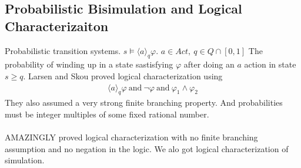 \documentclass[../598comp.tex]{subfiles}
\begin{document}
\subsection{Probabilistic Bisimulation and Logical Characterizaiton}

Probabilistic transition systems. $s \models \langle a \rangle_q \varphi$. $a
\in Act, \ q \in Q \cap [0, 1]$
The probability of winding up in a state sastisfying $\varphi$ after doing an
$a$ action in state $s \geq q$. Larsen and Skou proved logical characterization
using
\begin{gather*}
  \langle a \rangle_q \varphi \ \text{and} \ \neg \varphi \ \text{and} \
  \varphi_1 \wedge \varphi_2
\end{gather*}
They also assumed a very strong finite branching property. And probabilities
must be integer multiples of some fixed rational number.
\\\\
AMAZINGLY proved logical characterization with no finite branching assumption
and no negation in the logic. We alo got logical characterization of simulation.
\end{document}

